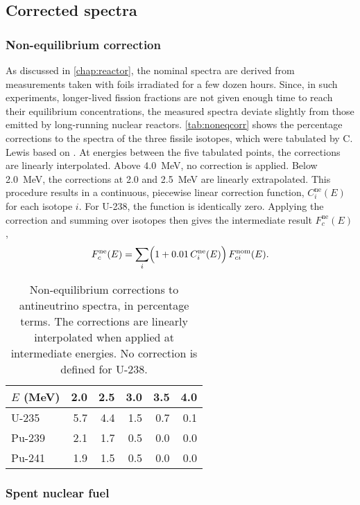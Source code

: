 \documentclass[../thesis.tex]{subfiles}
\begin{document}
\subsection{Corrected spectra}
\label{sec:corrspectra}

\subsubsection{Non-equilibrium correction}
\label{sec:noneqcorrspectra}

As discussed in \autoref{chap:reactor}, the nominal spectra are derived from
measurements taken with foils irradiated for a few dozen hours. Since, in such
experiments, longer-lived fission fractions are not given enough time to reach
their equilibrium concentrations, the measured spectra deviate slightly from
those emitted by long-running nuclear reactors. \autoref{tab:noneqcorr} shows
the percentage corrections to the spectra of the three fissile isotopes, which
were tabulated by C. Lewis \cite{Lewis} based on \cite{Mueller_2011}. At
energies between the five tabulated points, the corrections are linearly
interpolated. Above 4.0~MeV, no correction is applied. Below 2.0~MeV, the
corrections at 2.0 and 2.5~MeV are linearly extrapolated. This procedure results
in a continuous, piecewise linear correction function, $C^\mathrm{ne}_i(E)$ for
each isotope $i$. For U-238, the function is identically zero. Applying the
correction and summing over isotopes then gives the intermediate result
$F^\mathrm{ne}_c(E)$,
\[ F^\mathrm{ne}_c(E) = \sum_i \Bigl(1 + 0.01\, C^\mathrm{ne}_i(E)\Bigr)\,
  F^\mathrm{nom}_{ci}(E). \]

\begin{table}
  \centering
  \begin{tabular}{lrrrrr}
    \toprule
    $E$ (MeV) & 2.0 & 2.5 & 3.0 & 3.5 & 4.0 \\
    \midrule
    U-235 & 5.7 & 4.4 & 1.5 & 0.7 & 0.1 \\
    Pu-239 & 2.1 & 1.7 & 0.5 & 0.0 & 0.0 \\
    Pu-241 & 1.9 & 1.5 & 0.5 & 0.0 & 0.0 \\
    \bottomrule
  \end{tabular}
  \caption{Non-equilibrium corrections to antineutrino spectra, in percentage
    terms. The corrections are linearly interpolated when applied at
    intermediate energies. No correction is defined for U-238.}
  \label{tab:noneqcorr}
\end{table}

\subsubsection{Spent nuclear fuel}
\label{sec:snfcorrspectra}
\end{document}
